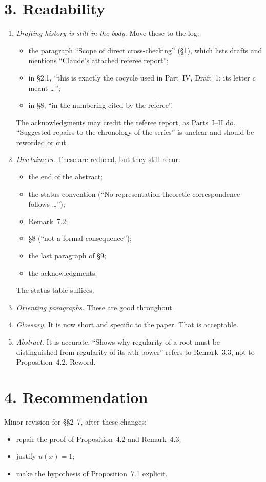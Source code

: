 \documentclass[11pt]{article}
\begin{document}
\section*{3. Readability}
\begin{enumerate}[label=(R\arabic*)]
\item \emph{Drafting history is still in the body.} Move these to the log:
\begin{itemize}
\item the paragraph ``Scope of direct cross-checking'' (\S1), which
lists drafts and mentions ``Claude's attached referee report'';
\item in \S2.1, ``this is exactly the cocycle used in Part~IV, Draft~1;
its letter $c$ meant \ldots'';
\item in \S8, ``in the numbering cited by the referee''.
\end{itemize}
The acknowledgments may credit the referee report, as Parts~I--II do.
``Suggested repairs to the chronology of the series'' is unclear and
should be reworded or cut.
\item \emph{Disclaimers.} These are reduced, but they still recur:
\begin{itemize}
\item the end of the abstract;
\item the status convention (``No representation-theoretic correspondence
follows \ldots'');
\item Remark~7.2;
\item \S8 (``not a formal consequence'');
\item the last paragraph of \S9;
\item the acknowledgments.
\end{itemize}
The status table suffices.
\item \emph{Orienting paragraphs.} These are good throughout.
\item \emph{Glossary.} It is now short and specific to the paper. That is
acceptable.
\item \emph{Abstract.} It is accurate. ``Shows why regularity of a root must
be distinguished from regularity of its $n$th power'' refers to
Remark~3.3, not to Proposition~4.2. Reword.
\end{enumerate}

\section*{4. Recommendation}
Minor revision for \S\S2--7, after these changes:
\begin{itemize}
\item repair the proof of Proposition~4.2 and Remark~4.3;
\item justify $u(x)=1$;
\item make the hypothesis of Proposition~7.1 explicit.
\end{itemize}
\end{document}
